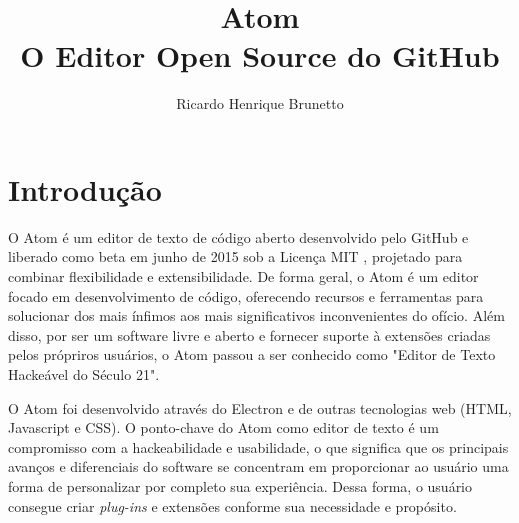 

\sloppy

\title{Atom\\O Editor Open Source do GitHub}

\author{Ricardo Henrique Brunetto}


\address{Departamento de Informática -- Universidade Estadual de Maringá (UEM)\\
	Maringá -- PR -- Brasil
}



	\maketitle

	{}

	\newpage
	\tableofcontents
	\newpage

  \section{Introdução}\label{sec:intro}
	O Atom é um editor de texto de código aberto desenvolvido pelo GitHub e liberado como beta em junho de 2015 sob a Licença MIT \cite{licencaMIT}, projetado para combinar flexibilidade e extensibilidade. De forma geral, o Atom é um editor focado em desenvolvimento de código, oferecendo recursos e ferramentas para solucionar dos mais ínfimos aos mais significativos inconvenientes do ofício. Além disso, por ser um software livre e aberto e fornecer suporte à extensões criadas pelos própriros usuários, o Atom passou a ser conhecido como "Editor de Texto Hackeável do Século 21".

	O Atom foi desenvolvido através do Electron e de outras tecnologias web (HTML, Javascript e CSS). O ponto-chave do Atom como editor de texto é um compromisso com a hackeabilidade e usabilidade, o que significa que os principais avanços e diferenciais do software se concentram em proporcionar ao usuário uma forma de personalizar por completo sua experiência. Dessa forma, o usuário consegue criar \textit{plug-ins} e extensões conforme sua necessidade e propósito.

